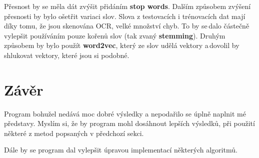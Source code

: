 \documentclass[12pt]{article}
\begin{document}
Přesnost by se měla dát zvýšit přidáním \textbf{stop words}.
Dalším způsobem zvýšení přesnosti by bylo ošetřit variaci slov.
Slova z testovacích i trénovacích dat mají díky tomu, že jsou 
skenována OCR, velké množství chyb. To by se\,dalo částečně vylepšit
používáním pouze kořenů slov (tak zvaný \textbf{stemming}). Druhým
způsobem by bylo použít \textbf{word2vec}, který ze slov udělá 
vektory a\,dovolil by shlukovat vektory, které jsou si podobné.
%
%
\section{Závěr}
Program bohužel nedává moc dobré výsledky a nepodařilo se úplně
naplnit mé představy. Myslím si, že by program mohl dosáhnout lepších
výsledků, při použití některé z metod popsaných v předchozí sekci.

Dále by se program dal vylepšit úpravou implementací některých
algoritmů.
%
\end{document}
